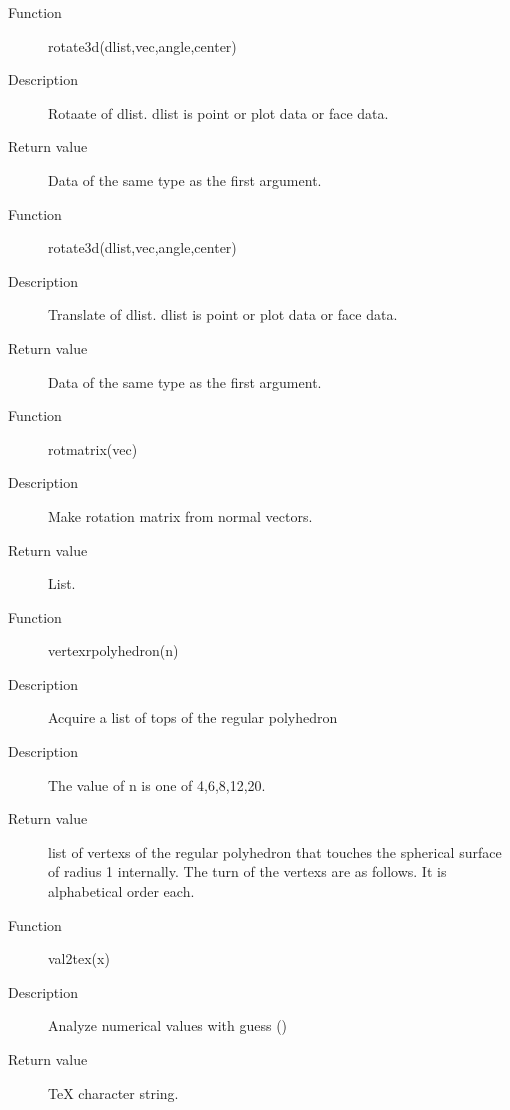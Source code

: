 \documentclass[papersize,a4paper,12pt]{article}
\begin{document}
\begin{description}
\hypertarget{rotate3d}{}
\item[Function] rotate3d(dlist,vec,angle,center)
\item[Description] Rotaate of dlist.  dlist is point or plot data or face data.
\item[Return value]  Data of the same type as the first argument.


\hypertarget{translate3d}{}
\item[Function] rotate3d(dlist,vec,angle,center)
\item[Description] Translate of dlist.  dlist is point or plot data or face data.
\item[Return value]  Data of the same type as the first argument.


\vspace{\baselineskip}
\hypertarget{rotmatrix}{}
\item[Function] rotmatrix(vec)
\item[Description] Make rotation matrix from normal vectors.
\item[Return value] List.

\vspace{\baselineskip}

\hypertarget{vertexrpolyhedron}{}
\item[Function] vertexrpolyhedron(n)
\item[Description] Acquire a list of tops of the regular polyhedron
\item[Description] The value of n is one of 4,6,8,12,20. 
\item[Return value]  list of vertexs of the regular polyhedron that touches the spherical surface of radius 1 internally. The turn of the vertexs are as follows.  It is alphabetical order each.

    

    

 


\hypertarget{val2tex}{}\item[Function] val2tex(x)
\item[Description] Analyze numerical values with guess ()
\item[Return value] TeX character string.


\end{description}
\end{document}
